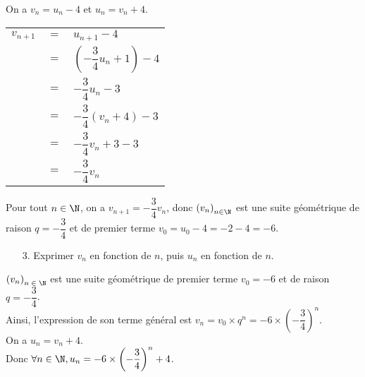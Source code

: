 \vspace*{.3cm}

On a $v_n = u_n - 4$ et $u_n = v_n + 4$. \\

\begin{tabular}{lll}
$v_{n+1}$ & $=$ & $u_{n+1} - 4$ \vspace*{.3cm} \\
& $=$ & $\left(-\dfrac{3}{4}u_n + 1\right) - 4$ \vspace*{.3cm} \\
& $=$ & $-\dfrac{3}{4}u_n - 3$ \vspace*{.3cm}
\\
& $=$ & $-\dfrac{3}{4}\left(v_n + 4\right) - 3$ \vspace*{.3cm} \\
& $=$ & $-\dfrac{3}{4}v_n + 3 - 3$ \vspace*{.3cm} \\
& $=$ & $-\dfrac{3}{4}v_n$ \vspace*{.3cm} \\
\end{tabular}

\vspace*{.3cm}

Pour tout $n \in \N$, on a $v_{n+1} =-\dfrac{3}{4}v_n$, donc $\left(v_n\right)_{n \in \N}$ est une suite géométrique de raison $q = -\dfrac{3}{4}$ et de premier terme $v_0 = u_0 - 4 = -2 - 4 = -6$. \\

\begin{itemize}
\item[3.] Exprimer $v_n$ en fonction de $n$, puis $u_n$ en fonction de $n$. \\
\end{itemize}

$\left(v_n\right)_{n \; \in \; \N}$ est une suite géométrique de premier terme $v_0 =-6$ et de raison $q = -\dfrac{3}{4}$. \\

Ainsi, l'expression de son terme général est $v_n = v_0 \times q^n = -6 \times \left(-\dfrac{3}{4}\right)^n$. \\

On a $u_n = v_n + 4$. \\

Donc $\forall n \in \N, u_n = -6 \times \left(-\dfrac{3}{4}\right)^n + 4$. 

\vspace*{-5cm}

\newpage

